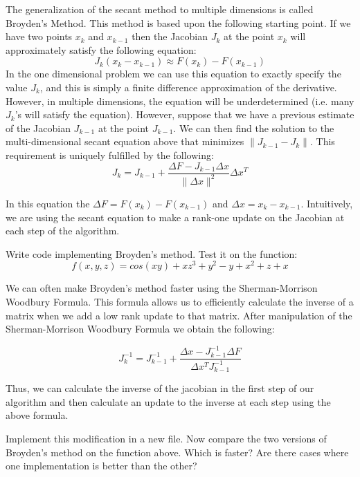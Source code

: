 The generalization of the secant method to multiple dimensions is called Broyden's Method. This method is based upon the following starting point. If we have two points $x_k$ and $x_{k-1}$ then the Jacobian $J_k$ at the point $x_k$ will approximately satisfy the following equation:
\[
J_k (x_k-x_{k-1}) \approx F(x_k) - F(x_{k-1})
\]
In the one dimensional problem we can use this equation to exactly specify the value $J_k$, and this is simply a finite difference approximation of the derivative. However, in multiple dimensions, the equation will be underdetermined (i.e. many $J_k$'s will satisfy the equation). However, suppose that we have a previous estimate of the Jacobian $J_{k-1}$ at the point $J_{k-1}$. We can then find the solution to the multi-dimensional secant equation above that minimizes $\|J_{k-1}-J_k\|$. This requirement is uniquely fulfilled by the following:
\[
J_k = J_{k-1} + \frac{\Delta F-J_{k-1} \Delta x}{\|\Delta x\|^2}\Delta x^T
\]

In this equation the $\Delta F = F(x_k)-F(x_{k-1})$ and $\Delta x = x_k-x_{k-1}$. Intuitively, we are using the secant equation to make a rank-one update on the Jacobian at each step of the algorithm.

\begin{problem}
Write code implementing Broyden's method. Test it on the function:
\[
f(x,y,z) = cos(xy) + xz^3 + y^2 - y + x^2 + z + x
\]
\end{problem}

We can often make Broyden's method faster using the Sherman-Morrison Woodbury Formula. This formula allows us to efficiently calculate the inverse of a matrix when we add a low rank update to that matrix. After manipulation of the Sherman-Morrison Woodbury Formula we obtain the following:

\[
J_k^{-1} = J_{k-1}^{-1} + \frac{\Delta x - J_{k-1}^{-1}\Delta F}{\Delta x^T J_{k-1}^{-1}}
\]

Thus, we can calculate the inverse of the jacobian in the first step of our algorithm and then calculate an update to the inverse at each step using the above formula.

\begin{problem}
Implement this modification in a new file. Now compare the two versions of Broyden's method on the function above. Which is faster? Are there cases where one implementation is better than the other?
\end{problem}
